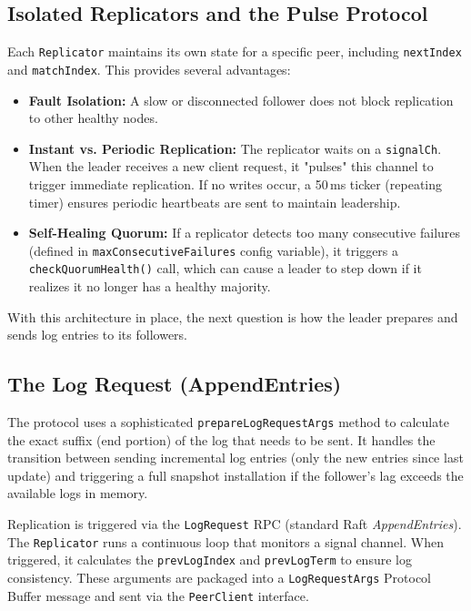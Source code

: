 \documentclass[shortabstract]{iithesis}
\begin{document}
\subsection{Isolated Replicators and the Pulse Protocol}
Each \texttt{Replicator} maintains its own state for a specific peer, including \texttt{nextIndex} and \texttt{matchIndex}. This provides several advantages:
\begin{itemize}
    \item \textbf{Fault Isolation:} A slow or disconnected follower does not block replication to other healthy nodes.
    \item \textbf{Instant vs. Periodic Replication:} The replicator waits on a \texttt{signalCh}. When the leader receives a new client request, it "pulses" this channel to trigger immediate replication. If no writes occur, a 50\,ms ticker (repeating timer) ensures periodic heartbeats are sent to maintain leadership.
    \item \textbf{Self-Healing Quorum:} If a replicator detects too many consecutive failures (defined in \texttt{maxConsecutiveFailures} config variable), it triggers a \\ \texttt{checkQuorumHealth()} call, which can cause a leader to step down if it realizes it no longer has a healthy majority.
\end{itemize}

With this architecture in place, the next question is how the leader prepares and sends log entries to its followers.

\subsection{The Log Request (AppendEntries)}
The protocol uses a sophisticated \texttt{prepareLogRequestArgs} method to calculate the exact suffix (end portion) of the log that needs to be sent. It handles the transition between sending incremental log entries (only the new entries since last update) and triggering a full snapshot installation if the follower's lag exceeds the available logs in memory.

Replication is triggered via the \texttt{LogRequest} RPC (standard Raft \textit{AppendEntries}). The \texttt{Replicator} runs a continuous loop that monitors a signal channel. When triggered, it calculates the \texttt{prevLogIndex} and \texttt{prevLogTerm} to ensure log consistency. These arguments are packaged into a \texttt{LogRequestArgs} Protocol Buffer message and sent via the \texttt{PeerClient} interface.
\end{document}
